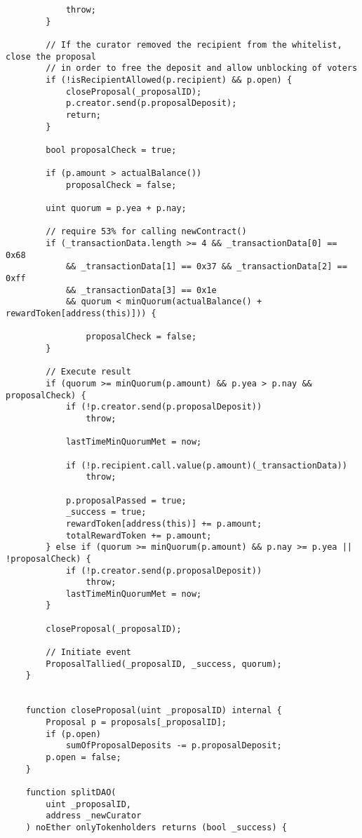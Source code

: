 \documentclass[9pt,oneside]{amsart}
\begin{document}
\begin{appendix}
\begin{verbatim}
            throw;
        }

        // If the curator removed the recipient from the whitelist, close the proposal
        // in order to free the deposit and allow unblocking of voters
        if (!isRecipientAllowed(p.recipient) && p.open) {
            closeProposal(_proposalID);
            p.creator.send(p.proposalDeposit);
            return;
        }

        bool proposalCheck = true;

        if (p.amount > actualBalance())
            proposalCheck = false;

        uint quorum = p.yea + p.nay;

        // require 53% for calling newContract()
        if (_transactionData.length >= 4 && _transactionData[0] == 0x68
            && _transactionData[1] == 0x37 && _transactionData[2] == 0xff
            && _transactionData[3] == 0x1e
            && quorum < minQuorum(actualBalance() + rewardToken[address(this)])) {

                proposalCheck = false;
        }

        // Execute result
        if (quorum >= minQuorum(p.amount) && p.yea > p.nay && proposalCheck) {
            if (!p.creator.send(p.proposalDeposit))
                throw;

            lastTimeMinQuorumMet = now;

            if (!p.recipient.call.value(p.amount)(_transactionData))
                throw;

            p.proposalPassed = true;
            _success = true;
            rewardToken[address(this)] += p.amount;
            totalRewardToken += p.amount;
        } else if (quorum >= minQuorum(p.amount) && p.nay >= p.yea || !proposalCheck) {
            if (!p.creator.send(p.proposalDeposit))
                throw;
            lastTimeMinQuorumMet = now;
        }

        closeProposal(_proposalID);

        // Initiate event
        ProposalTallied(_proposalID, _success, quorum);
    }


    function closeProposal(uint _proposalID) internal {
        Proposal p = proposals[_proposalID];
        if (p.open)
            sumOfProposalDeposits -= p.proposalDeposit;
        p.open = false;
    }

    function splitDAO(
        uint _proposalID,
        address _newCurator
    ) noEther onlyTokenholders returns (bool _success) {


\end{verbatim}
\end{appendix}
\end{document}
